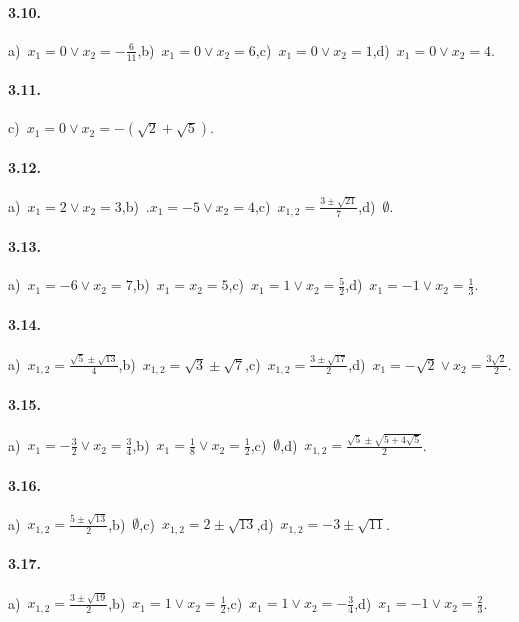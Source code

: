 \paragraph{3.10.} a)~$x_{1} = 0 \vee x_{2} = - \frac{6}{11}$,\quad b)~$x_{1} = 0 \vee x_{2} = 6$,\quad c)~$x_{1} = 0 \vee x_{2} = 1$,\quad d)~$x_{1} = 0 \vee x_{2} = 4$.

\paragraph{3.11.} c)~$x_{1} = 0 \vee x_{2} = - (\sqrt{2} + \sqrt{5})$.

\paragraph{3.12.} a)~$x_{1} = 2 \vee x_{2} = 3$,\quad b)~.$x_{1} =-5 \vee x_{2} = 4$,\quad c)~$x_{1,2} = \frac{3 \pm \sqrt{21}}{7}$,\quad d)~$\emptyset$.

\paragraph{3.13.} a)~$x_{1} =-6 \vee x_{2} = 7$,\quad b)~$x_{1} = x_{2} = 5$,\quad c)~$x_{1} = 1 \vee x_{2} = \frac{5}{2}$,\quad d)~$x_{1} =-1 \vee x_{2} = \frac{1}{3}$.

\paragraph{3.14.} a)~$x_{1,2} = \frac{\sqrt{5} \pm \sqrt{13}}{4}$,\quad b)~$x_{1,2} = \sqrt{3} \pm \sqrt{7}$,\quad c)~$x_{1,2} = \frac{3 \pm \sqrt{17}}{2}$,\quad d)~$x_{1} =-\sqrt{2} \vee x_{2} = \frac{3 \sqrt{2}}{2}$.

\paragraph{3.15.} a)~$x_{1} =-\frac{3}{2} \vee x_{2} = \frac{3}{4}$,\quad b)~$x_{1} = \frac{1}{8} \vee x_{2} = \frac{1}{2}$,\quad c)~$\emptyset$,\quad d)~$x_{1,2} = \frac{\sqrt{5} \pm \sqrt{5 + 4 \sqrt{5}}}{2}$.

\paragraph{3.16.} a)~$x_{1,2} = \frac{5 \pm \sqrt{13}}{2}$,\quad b)~$\emptyset$,\quad c)~$x_{1,2} = 2 \pm \sqrt{13}$,\quad d)~$x_{1,2} =-3 \pm \sqrt{11}$.

\paragraph{3.17.} a)~$x_{1,2} = \frac{3 \pm \sqrt{19}}{2}$,\quad b)~$x_{1} = 1 \vee x_{2} = \frac{1}{2}$,\quad c)~$x_{1} = 1 \vee x_{2} =-\frac{3}{4}$,\quad d)~$x_{1} =-1 \vee x_{2} = \frac{2}{3}$.

